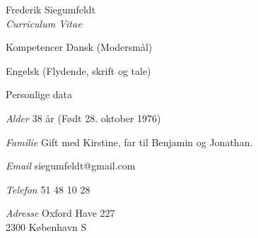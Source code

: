 \documentclass[a4paper]{article}
\begin{document}
\begin{cv}{Frederik Siegumfeldt\\{\large \itshape Curriculum Vitae}}
\begin{cvlist}{Kompetencer}
    Dansk (Modersmål)

    Engelsk (Flydende, skrift og tale)

\end{cvlist}

\begin{cvlist}{Personlige data}

  \item[\emph{Alder}]       38 år (Født 28. oktober 1976)

  \item[\emph{Familie}]     Gift med Kirstine, far til Benjamin og Jonathan. 

  \item[\emph{Email}]       siegumfeldt@gmail.com

  \item[\emph{Telefon}]     51 48 10 28

  \item[\emph{Adresse}]     Oxford Have 227\\ 
                            2300 København S

\end{cvlist}
\end{cv}
\end{document}
